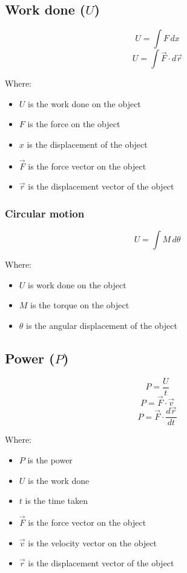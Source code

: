 \documentclass[11pt]{article}
\begin{document}
\subsection{Work done (\(U\))}
\label{sec:org38af5c1}
\[U = \int F \, dx\]
\[U = \int \vec{F} \cdot d \vec{r}\]

Where:
\begin{itemize}
\item \(U\) is the work done on the object
\item \(F\) is the force on the object
\item \(x\) is the displacement of the object
\item \(\vec{F}\) is the force vector on the object
\item \(\vec{r}\) is the displacement vector of the object
\end{itemize}

\subsubsection{Circular motion}
\label{sec:orge3f8faa}
\[U = \int M \, d \theta\]

Where:
\begin{itemize}
\item \(U\) is work done on the object
\item \(M\) is the torque on the object
\item \(\theta\) is the angular displacement of the object
\end{itemize}

\subsection{Power (\(P\))}
\label{sec:org0f04934}
\[P = \frac{U}{t}\]
\[P = \vec{F} \cdot \vec{v}\]
\[P = \vec{F} \cdot \frac{d \vec{r}}{dt}\]

Where:
\begin{itemize}
\item \(P\) is the power
\item \(U\) is the work done
\item \(t\) is the time taken
\item \(\vec{F}\) is the force vector on the object
\item \(\vec{v}\) is the velocity vector on the object
\item \(\vec{r}\) is the displacement vector of the object
\end{itemize}
\end{document}
